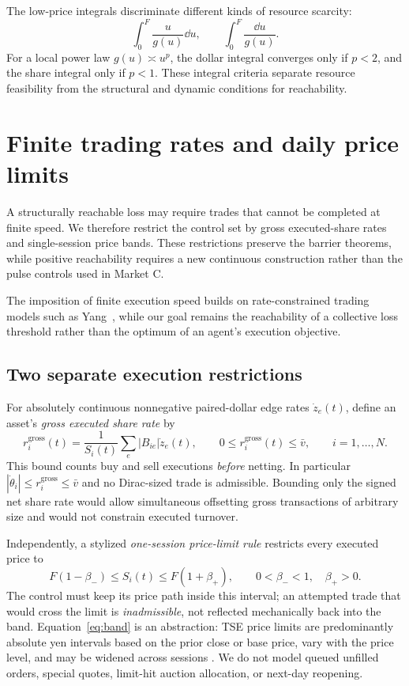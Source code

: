 \documentclass[review,hidelinks,onefignum,onetabnum]{siamonline250211}
\begin{document}
The low-price integrals discriminate different kinds of resource scarcity:
\begin{equation}\label{eq:lowprice}
\int_0^F\frac{u}{g(u)}\dd u,\qquad
\int_0^F\frac{\dd u}{g(u)}.
\end{equation}
For a local power law $g(u)\asymp u^p$, the dollar integral converges only if $p<2$, and the share integral only if $p<1$. These integral criteria separate resource feasibility from the structural and dynamic conditions for reachability.


\section{Finite trading rates and daily price limits}\label{sec:rateband}
A structurally reachable loss may require trades that cannot be completed at finite speed. We therefore restrict the control set by gross executed-share rates and single-session price bands. These restrictions preserve the barrier theorems, while positive reachability requires a new continuous construction rather than the pulse controls used in Market C.

The imposition of finite execution speed builds on rate-constrained trading models such as Yang~\citep{Yang2019}, while our goal remains the reachability of a collective loss threshold rather than the optimum of an agent's execution objective.

\subsection{Two separate execution restrictions}
For absolutely continuous nonnegative paired-dollar edge rates $\dot z_e(t)$, define an asset's \emph{gross executed share rate} by
\begin{equation}\label{eq:grossrate}
 r_i^{\mathrm{gross}}(t)=\frac{1}{S_i(t)}\sum_e |B_{ie}|\dot z_e(t),\qquad
 0\le r_i^{\mathrm{gross}}(t)\le\bar v,\qquad i=1,\ldots,N.
\end{equation}
This bound counts buy and sell executions \emph{before} netting. In particular $|\dot\theta_i|\le r_i^{\mathrm{gross}}\le\bar v$ and no Dirac-sized trade is admissible. Bounding only the signed net share rate would allow simultaneous offsetting gross transactions of arbitrary size and would not constrain executed turnover.

Independently, a stylized \emph{one-session price-limit rule} restricts every executed price to
\begin{equation}\label{eq:band}
 F(1-\beta_-)\le S_i(t)\le F(1+\beta_+),\qquad
 0<\beta_-<1,\quad\beta_+>0.
\end{equation}
The control must keep its price path inside this interval; an attempted trade that would cross the limit is \emph{inadmissible}, not reflected mechanically back into the band. Equation~\eqref{eq:band} is an abstraction: TSE price limits are predominantly absolute yen intervals based on the prior close or base price, vary with the price level, and may be widened across sessions \citep{JPX2026}. We do not model queued unfilled orders, special quotes, limit-hit auction allocation, or next-day reopening.
\end{document}
